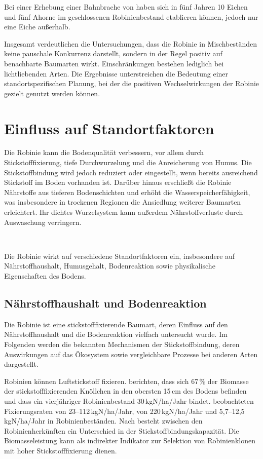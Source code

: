 \documentclass[twocolumn]{scrartcl}
\makeatletter
\newcommand{\summary}[1]{%
  \par %
  {\small\sffamily
    \noindent #1\par}
  \vspace{-0.4em}
  \noindent\makebox[\linewidth]{\rule{0.33\linewidth}{0.4pt}}\\[-1.2em]
  \@afterindentfalse\@afterheading
}
\makeatother
\begin{document}
Bei einer Erhebung einer Bahnbrache von \citet{kowarik1996robinie}
haben sich in fünf Jahren 10 Eichen und fünf Ahorne im geschlossenen
Robinienbestand etablieren können, jedoch nur eine Eiche außerhalb.

Insgesamt verdeutlichen die Untersuchungen, dass die Robinie in
Mischbeständen keine pauschale Konkurrenz darstellt, sondern in der
Regel positiv auf benachbarte Baumarten wirkt. Einschränkungen
bestehen lediglich bei lichtliebenden Arten. Die Ergebnisse
unterstreichen die Bedeutung einer standortspezifischen Planung, bei
der die positiven Wechselwirkungen der Robinie gezielt genutzt werden
können.


\section{Einfluss auf Standortfaktoren}

\summary{Die Robinie kann die Bodenqualität verbessern, vor allem durch Stickstofffixierung, tiefe Durchwurzelung und die Anreicherung von Humus. Die Stickstoffbindung wird jedoch reduziert oder eingestellt, wenn bereits ausreichend Stickstoff im Boden vorhanden ist. Darüber hinaus erschließt die Robinie Nährstoffe aus tieferen Bodenschichten und erhöht die Wasserspeicherfähigkeit, was insbesondere in trockenen Regionen die Ansiedlung weiterer Baumarten erleichtert. Ihr dichtes Wurzelsystem kann außerdem Nährstoffverluste durch Auswaschung verringern.}

Die Robinie wirkt auf verschiedene Standortfaktoren ein, insbesondere
auf Nährstoffhaushalt, Humusgehalt, Bodenreaktion sowie physikalische
Eigenschaften des Bodens.

\subsection{Nährstoffhaushalt und Bodenreaktion}

Die Robinie ist eine stickstofffixierende Baumart, deren Einfluss auf
den Nährstoffhaushalt und die Bodenreaktion vielfach untersucht
wurde. Im Folgenden werden die bekannten Mechanismen der
Stickstoffbindung, deren Auswirkungen auf das Ökosystem sowie
vergleichbare Prozesse bei anderen Arten dargestellt.

Robinien können Luftstickstoff fixieren.
\citet{boring1984robinieN} berichten, dass sich 67\,\% der Biomasse der stickstofffixierenden Knöllchen in den obersten 15\,cm des Bodens befinden und dass ein vierjähriger Robinienbestand 30\,kgN/ha/Jahr bindet.
\citet{noh2009robinieN} beobachteten Fixierungsraten von 23--112\,kgN/ha/Jahr, \citet{danso1995robinieN} von 220\,kgN/ha/Jahr und \citet{marron2018robinieN} 5,7--12,5\,kgN/ha/Jahr in Robinienbeständen.
Nach \citet{moshki2011robinieN} besteht zwischen den Robinienherkünften ein Unterschied in der Stickstoffbindungskapazität. Die Biomasseleistung kann als indirekter Indikator zur Selektion von Robinienklonen mit hoher Stickstofffixierung dienen.
\end{document}
